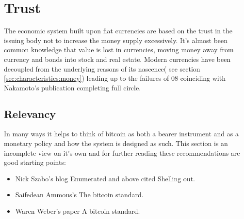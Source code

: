 \section{Trust}

The economic system built upon fiat currencies are based on the trust in the issuing body not to increase the money supply excessively. It's almost been common knowledge that value is lost in currencies, moving money away from currency and bonds into stock and real estate. Modern currencies have been decoupled from the underlying reasons of its nascence( see section \ref{sec:characteristics:money}) leading up to the failures of 08 coinciding with Nakamoto's publication completing full circle.

\newpage
\noindent
\vspace{6cm}

\subsection{Relevancy}
In many ways it helps to think of bitcoin as both a bearer instrument and as a monetary policy and how the system is designed as such. This section is an incomplete view on it's own and for further reading these recommendations are good starting points: 

\begin{itemize}
	\item Nick Szabo's blog Enumerated and above cited Shelling out\cite{szabo:shelling:out}\cite{szabo:unenumerated}.
	\item Saifedean Ammous's The bitcoin standard.\cite{ammous:bitcoin:standard}
	\item Waren Weber's paper A bitcoin standard.\cite{weber:bitcoin:standard}
\end{itemize}